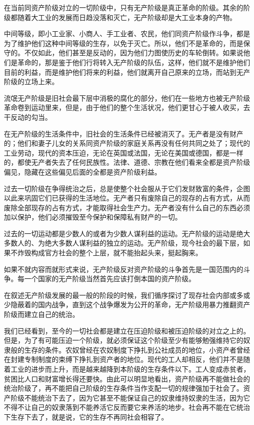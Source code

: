 \documentclass[10pt, UTF8]{book} %
\begin{document}
在当前同资产阶级对立的一切阶级中，只有无产阶级是真正革命的阶级。其余的阶级都随着大工业的发展而日趋没落和灭亡，无产阶级却是大工业本身的产物。

中间等级，即小工业家、小商人、手工业者、农民，他们同资产阶级作斗争，都是为了维护他们这种中间等级的生存，以免于灭亡。所以，他们不是革命的，而是保守的。不仅如此，他们甚至是反动的，因为他们力图使历史的车轮倒转。如果说他们是革命的，那是鉴于他们行将转入无产阶级的队伍，这样，他们就不是维护他们目前的利益，而是维护他们将来的利益，他们就离开自己原来的立场，而站到无产阶级的立场上来。

流氓无产阶级是旧社会最下层中消极的腐化的部分，他们在一些地方也被无产阶级革命卷到运动里来，但是，由于他们的整个生活状况，他们更甘心于被人收买，去干反动的勾当。

在无产阶级的生活条件中，旧社会的生活条件已经被消灭了。无产者是没有财产的；他们和妻子儿女的关系同资产阶级的家庭关系再没有任何共同之处了；现代的工业劳动，现代的资本压迫，无论在英国或法国，无论在美国或德国，都是一样的，都使无产者失去了任何民族性。法律、道德、宗教在他们看来全都是资产阶级偏见，隐藏在这些偏见后面的全都是资产阶级利益。

过去一切阶级在争得统治之后，总是使整个社会服从于它们发财致富的条件，企图以此来巩固它们已获得的生活地位。无产者只有废除自己的现存的占有方式，从而废除全部现存的占有方式，才能取得社会生产力。无产者没有什么自己的东西必须加以保护，他们必须摧毁至今保护和保障私有财产的一切。

过去的一切运动都是少数人的或者为少数人谋利益的运动。无产阶级的运动是绝大多数人的、为绝大多数人谋利益的独立的运动。无产阶级，现今社会的最下层，如果不炸毁构成官方社会的整个上层，就不能抬起头来，挺起胸来。

如果不就内容而就形式来说，无产阶级反对资产阶级的斗争首先是一国范围内的斗争。每一个国家的无产阶级当然首先应该打倒本国的资产阶级。

在叙述无产阶级发展的最一般的阶段的时候，我们循序探讨了现存社会内部或多或少隐蔽着的国内战争，直到这个战争爆发为公开的革命，无产阶级用暴力推翻资产阶级而建立自己的统治。

我们已经看到，至今的一切社会都是建立在压迫阶级和被压迫阶级的对立之上的。但是，为了有可能压迫一个阶级，就必须保证这个阶级至少有能够勉强维持它的奴隶般的生存的条件。农奴曾经在农奴制度下挣扎到公社成员的地位，小资产者曾经在封建专制制度的束缚下挣扎到资产者的地位。现代的工人却相反，他们并不是随着工业的进步而上升，而是越来越降到本阶级的生存条件以下。工人变成赤贫者，贫困比人口和财富增长得还要快。由此可以明显地看出，资产阶级再不能做社会的统治阶级了，再不能把自己阶级的生存条件当作支配一切的规律强加于社会了。资产阶级不能统治下去了，因为它甚至不能保证自己的奴隶维持奴隶的生活，因为它不得不让自己的奴隶落到不能养活它反而要它来养活的地步。社会再不能在它统治下生存下去了，就是说，它的生存不再同社会相容了。
\end{document}
